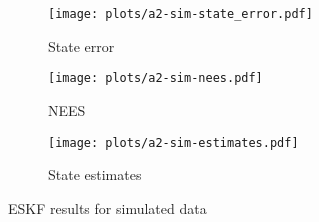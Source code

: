 


\begin{figure}
    \centering
    \begin{subfigure}{0.49\textwidth}
        \texttt{[image: plots/a2-sim-state\_error.pdf]}
        \caption{State error}
        \label{fig:eskf-sim-state-error}
    \end{subfigure}
    \hfill
    \begin{subfigure}{0.49\textwidth}
        \texttt{[image: plots/a2-sim-nees.pdf]}
        \caption{NEES}
        \label{fig:eskf-sim-nees}
    \end{subfigure}
    \hfill
    \begin{subfigure}{0.50\textwidth}
        \texttt{[image: plots/a2-sim-estimates.pdf]}
        \caption{State estimates}
        \label{fig:a2-sim-estimates}
    \end{subfigure}

    \caption{ESKF results for simulated data}
    \label{fig:eskf-sim-error-NEES}
\end{figure}



